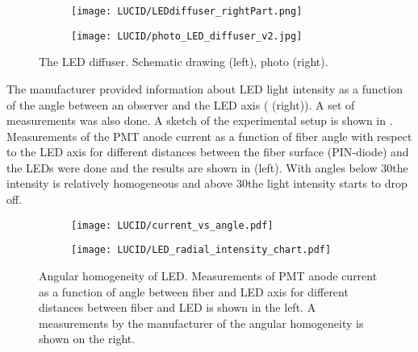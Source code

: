 \begin{figure}
\begin{subfigure}{.48\textwidth}
  \centering
  \texttt{[image: LUCID/LEDdiffuser\_rightPart.png]}
\end{subfigure}
\begin{subfigure}{.48\textwidth}
  \centering
  \texttt{[image: LUCID/photo\_LED\_diffuser\_v2.jpg]}
\end{subfigure}

\caption{The LED diffuser. Schematic drawing (left), photo (right).}
\label{fig:LEDDiffuser}
\end{figure}
  


The manufacturer provided information about LED light intensity as a function of the angle between an observer and the LED axis 
( (right)).
A set of measurements was also done.
A sketch of the experimental setup is shown in .
Measurements of the PMT anode current as a function of fiber angle with respect to the LED axis for different distances between 
the fiber surface (PIN-diode) and the LEDs were done and the results are shown in  (left).
With angles below 30\degree the intensity is relatively homogeneous and above 30\degree the light intensity starts to drop off.

\begin{figure}
\begin{subfigure}{.46\textwidth}
  \centering
  \texttt{[image: LUCID/current\_vs\_angle.pdf]}
\end{subfigure}
\begin{subfigure}{.51\textwidth}
  \centering
  \texttt{[image: LUCID/LED\_radial\_intensity\_chart.pdf]}
\end{subfigure}

\caption{Angular homogeneity of LED. 
Measurements of PMT anode current as a function of angle between fiber and LED axis for different distances between fiber and LED is shown in the left.
A measurements by the manufacturer of the angular homogeneity is shown on the right.}
\label{fig:AngularDistributionOfLED}
\end{figure}

